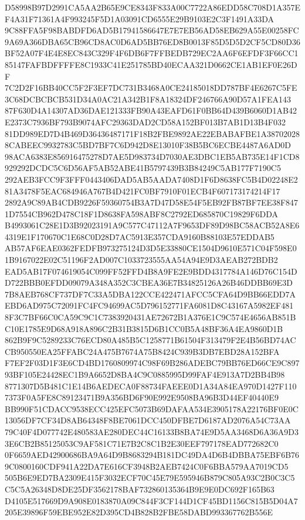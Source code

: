 \documentclass[UTF8,fontset=fandol,zihao=-4,a4paper]{ctexart}
\begin{document}
{{D58998B97D2991CA5AA2B65E9CE8343F833A00C7722A86EDD58C708D1A357EF4A31F71361A4F993245F5D1A03091CD6555E29B9103E2C3F1491A33DA
9C88FFA5F98BABDFD6AD5B17941586647E7E7EB56AD58EB629A55E00258FC9A69A366DBA65CB96CD8AC0D6AD5BB76ED8B0013F85D5D5D2CF5CD80D36
BF52A07F4E4E8EC843C329F4F6DB6F7FFBEDB729EC2AA6F6EFDF3F66CC185147FAFBDFFFFE8C1933C41E251785BD40ECAA321D0662CE1AB1EF0E26DF
7C2D2F16BB40CC5F2F3EF7DC731B3468A0CE24185018DD787BF4E6267C5FE3C68DCBCBCB531D34A0AC21A342B1F8A18324DF246766A90D57A1FEA143
87F630D4A14307AD36DAE121333FB90A43EAFD61F0BB64D439B6060D1AB42E2373C7936BF793B9074AFC29363DAD2CD58A152BF013B7AB1D13B4F032
81DD989ED7D4B469D36436487171F18B2FBE9892AE22EBABAFBE1A387020288CABEEC9932783C5BD7BF7C6D942D8E13010F38B5BC6ECBE4487A6AD0D
98ACA6383E856916475278D7AE5D983734D7030AE3DBC1EB5AB735E14F1CD8929292DCDC5C6D56AF5AB52ABE41B5797439B3B84249C5AB177F7190C5
292AEB3FCC9F3FFF0443406DAD5AB5AADA7408D1F6D8638FC5B4D02248E281A3478F5EAC684946A767B4D421FC0BF7910F01ECB4F607173174214F17
2892A9C89AB4CDB9226F59360754B3A7D47D58E54F5EB92FB87BF7EE38F8471D7554CB962D478C18F1D8638FA598ABF8C2792ED685870C19829F6DDA
B4993061C28E1D3B92023191A9C577C47112A7F9653DF89D98BC58ACB52A8E64319E1F170670C1E68C0D28D7AC5913E357CDA9160B88103E57EDDAB5
AB57AF6EAE0362FEDFB973275124D3D5E33880CE1504D9610E571C04F598E01B9167022E02C51196F2AD007C1033723555AA54A94E9D3AEAB272BDB2
EAD5AB17F074619054C099FF52FFD4B8A9FE2E9BDD4317784A146D76C154DD722BBB0EFDD09079A348A352C3CBEA36E7B34825126A26B46DDBB69E3D
7B8AEB768CF737DF7C33A5DBA122CCE422471AFCC5CFA64D9BB66EDD7AEBD6AD975C72091FC4FC94699AC5D796152771FA6081D8C43167A5982EF481
8F3C7BF66C0CA59C9C1C7383920431AE72672B1A376E1C9C574E4656AB851BC10E1785E9D68A918A896C2B31B3815D6B1CC0B5A48BF36A4EA9860D1B
862B9F9C5289233C76ECD80A485B5C1258771B61504F313479F2E4B56BD74ACCB950550EA25FFABC24A475B7674A75B8424C939B3DB7EBD28A152BFA
F7EF2F03D1F3E6CD4BD1760809974C98F69B286ADEBC79BB76ED66CE9C89793BF105E24428EC1B9A6652D8BA4C9C0885995D99FAF4E913A7D2BB4B98
8771307D5B481C1E14B6AEDECA0F88734FAEEE0D1A34A84EA970D1427F1107373F0A5FE8C89123471B9A356BD6F90E992E9508BA96B3D44EF40440E9
BB990F51CDACC9538ECC425EFC5073B69DAFAA534E3905178A22176BF0E0C13056DF7CF34D8AB64348F8BE7061DCC450DFBE7D6187AD2076A54C73AA
79C40F4D077742E480583AE280DEC44C16133B8BA74E9D5AA3468D6A36A9D33E6CB2B85125053C9AF581C71E7B2C8C1B2E30EEF797178EAD772682C0
0F6659AED42900686BA9A64D9B8683294B181DC49DA4D6B4DBBA75EBF6B769C0800160CDF941A22DA7E616CF3948B2AEB7424C0F6BBA579AA7019CD5
505B6E9ED7BA2309E415F3032ECF70C45E79E595946B879C805A93C2B0C3C5C5C5A26348D8DE25DF3562178BAF732860135364B9E9E0DC692F165B63
D4105E517669D9A908E0183870A09C844F3CF144D1CF45BD1156C815B5D04A7205E39896F59EBE952E82D395CD4B828B2FBE58DABD993367762B556E
}}
\end{document}
